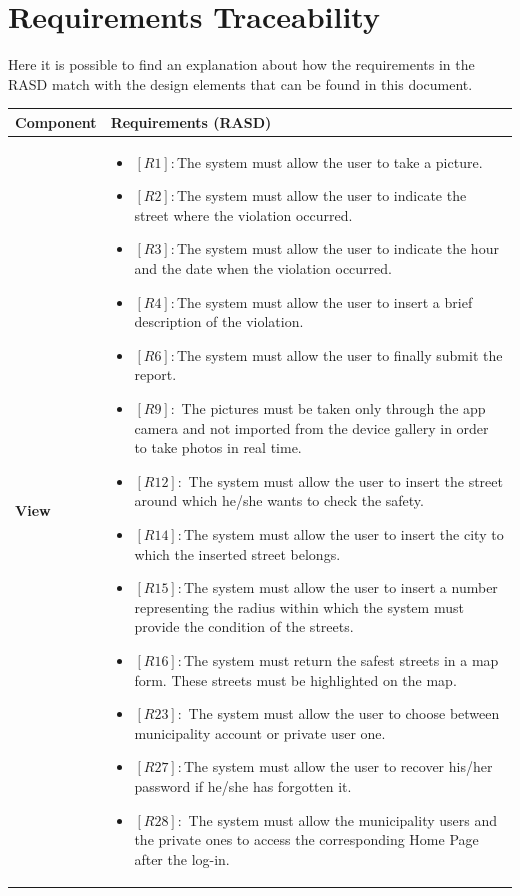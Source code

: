 \documentclass[titlepage]{article}
\begin{document}
\section{ Requirements Traceability}
Here it is possible to find an explanation about how the requirements in the RASD match with the design elements that can be found in this document.

\begin{longtable}{| p{4 cm} | p{11.5 cm} |} \hline
		Component  & Requirements (RASD) 
		 \\ \hline
		\newline \textbf {View} &
		\begin{itemize}
		\item \textbf{$[R1]:$}The system must allow the user to take a picture. 
		\item \textbf{$[R2]:$}The system must allow the user to indicate the street where the violation occurred. 
		\item \textbf{$[R3]:$}The system must allow the user to indicate the hour and the date when the violation occurred. 
		\item \textbf{$[R4]:$}The system must allow the user to insert a brief description of the violation. 
		 \item \textbf{$[R6]:$}The system must allow the user to finally submit the report. 
		 \item \textbf{$[R9]:$} The pictures must be taken only through the app camera and not imported from the device gallery in order to take photos in real time. 
		 \item \textbf{$[R12]:$} The system must allow the user to insert the street around which he/she wants to check the safety.
		 \item \textbf{$[R14]:$}The system must allow the user to insert the city to which the inserted street belongs. 
		 \item \textbf{$[R15]:$}The system must allow the user to insert a number representing the radius within which the system must provide the condition of the streets.
		 \item \textbf{$[R16]:$}The system must return the safest streets in a map form. These streets must be highlighted on the map.
		 \item \textbf{$[R23]:$} The system must allow the user to choose between municipality account or private user one. 
		 \item \textbf{$[R27]:$}The system must allow the user to recover his/her password if he/she has forgotten it.
		 \item \textbf{$[R28]:$} The system must allow the municipality users and the private ones to access the corresponding Home Page after the log-in. 

\end{itemize}
\end{longtable}
\end{document}
